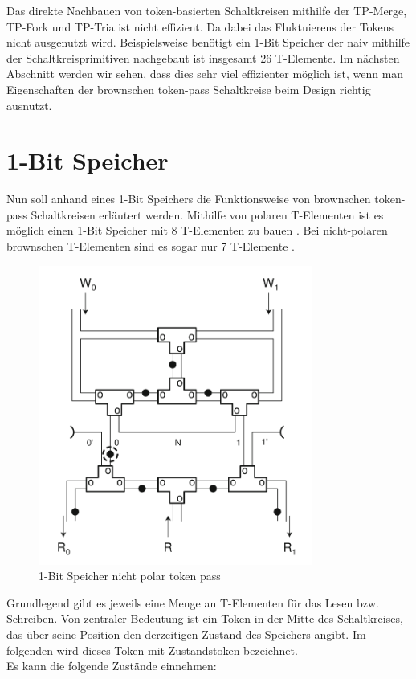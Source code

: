 \documentclass[11pt,a4paper]{article}
\begin{document}
%
Das direkte Nachbauen von token-basierten Schaltkreisen mithilfe
der TP-Merge, TP-Fork und TP-Tria ist nicht effizient.
%
Da dabei das Fluktuierens der Tokens nicht ausgenutzt wird.
%
Beispielsweise benötigt ein 1-Bit Speicher der naiv mithilfe der 
Schaltkreisprimitiven nachgebaut ist insgesamt 26 T-Elemente.
%
Im nächsten Abschnitt werden wir sehen, dass dies sehr viel effizienter möglich
ist, wenn man Eigenschaften der brownschen token-pass Schaltkreise
beim Design richtig ausnutzt.



\section{1-Bit Speicher}
Nun soll anhand eines 1-Bit Speichers die Funktionsweise von brownschen 
token-pass Schaltkreisen erläutert werden.
%
Mithilfe von polaren T-Elementen ist es möglich einen 1-Bit Speicher mit 8
T-Elementen zu bauen \cite{Peper_Fundamentals_2013}. 
%
Bei nicht-polaren brownschen T-Elementen sind es sogar
nur 7  T-Elemente \cite{Peper_nonPolar_2018}.

\begin{figure}[h]
      \centering
      \includegraphics[width=9cm]{bilder/NonPolarMemory.png} 
      \caption{1-Bit Speicher nicht polar token pass}
\end{figure}

Grundlegend gibt es jeweils eine Menge an T-Elementen für das Lesen bzw. 
Schreiben.
%
Von zentraler Bedeutung ist ein Token in der Mitte des Schaltkreises,
das über seine Position den derzeitigen Zustand des Speichers angibt.
%
Im folgenden wird dieses Token mit Zustandstoken bezeichnet. \\
%
Es kann die folgende Zustände einnehmen:
\end{document}
